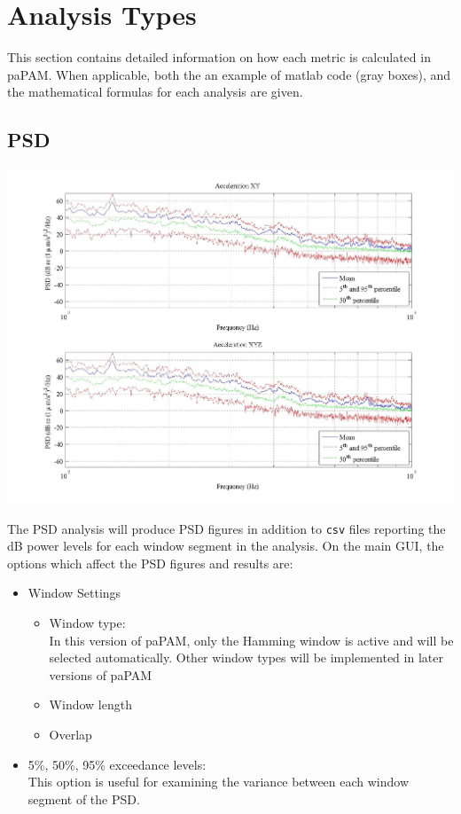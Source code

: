 \documentclass[11pt]{report}
\begin{document}
\chapter{Analysis Types} \label{AnalysisTypes}

This section contains detailed information on how each metric is calculated in paPAM.  When applicable, both the an example of matlab code (gray boxes), and the mathematical formulas for each analysis are given.

\section{PSD}

\begin{center}
\includegraphics[width = \textwidth ]{7.jpeg}
\end{center}

The PSD analysis will produce PSD figures in addition to \texttt{csv} files reporting the dB power levels for each window segment in the analysis.  On the main GUI, the options which affect the PSD figures and results are:
\begin{itemize}
\item Window Settings
\begin{itemize}
\item Window type:\\
In this version of paPAM, only the Hamming window is active and will be selected automatically.  Other window types will be implemented in later versions of paPAM
\item Window length
\item Overlap
\end{itemize}
\item 5\%, 50\%, 95\% exceedance levels:\\
This option is useful for examining the variance between each window segment of the PSD.
\end{itemize}
\end{document}
